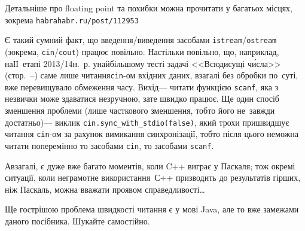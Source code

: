 Детальніше про floating point та похибки можна прочитати у багатьох місцях, зокрема \verb"habrahabr.ru/post/112953"\label{text:floating-point-end}

\label{text:io-streams-versus-scanf-printf}
Є такий сумний факт, що введення/\nolinebreak[2]виведення засобами \texttt{istream}/\nolinebreak[2]\texttt{ostream} (зокрема, \texttt{cin}/\nolinebreak[2]\texttt{cout}) працює повільно. Настільки повільно, що, наприклад, на\nolinebreak[2] ІІ~етапі 2013/14\nolinebreak[3] н.~р. у\nolinebreak[2] найбільшому тесті задачі <<Всюдисущі ч\'{и}сла>> (стор.~\mbox{\pageref{sec:omnipresent-numbers}--\pageref{text:omnipresent-numbers-end}}) саме лише читання\nolinebreak[1] \mbox{\verb"cin"-ом} вхідних даних, взагалі без обробки по~суті, вже перевищувало обмеження часу. Вихід\nolinebreak[3] --- читати функцією \texttt{scanf}, яка з незвички може здаватися незруч\-ною, зате швидко працює. Ще один спосіб зменшення проблеми (лише часткового зменшення, тобто його не~завжди достатньо)\nolinebreak[3] --- виклик \verb"cin.sync_with_stdio(false)", який трохи пришвидшує читання \verb"cin"-ом за рахунок вимикання синхронізації, тобто після цього не\nolinebreak[3] можна читати поперемінно то засобами \verb"cin", то засобами \verb"scanf".

А\nolinebreak[3] взагалі, є дуже вже багато моментів, коли C++ виграє у Паскаля; тож окремі ситуації, коли неграмотне використання~С++ призводить до результатів гірших, ніж Паскаль, можна вважати проявом справедливості\dots

Ще гострішою проблема швидкості читання є у мові Java, але то вже за\nolinebreak[3] межами даного посібника. Шукайте самостійно.\label{text:FAQ-end}


